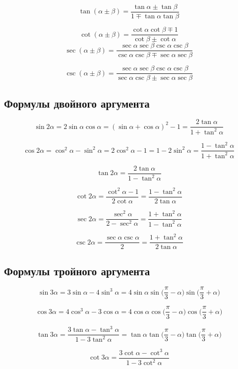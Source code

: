 \documentclass[
  letterpaper,
]{scrbook}
\theoremstyle{definition}
\theoremstyle{remark}
\begin{document}
\[
\tan (\alpha \pm \beta) = \frac{\tan \alpha \pm \tan \beta}{1 \mp \tan \alpha \tan \beta}
\]

\[
\cot (\alpha \pm \beta) = \frac{\cot \alpha \cot \beta \mp 1}{\cot \beta \pm \cot \alpha}
\] \[
\sec (\alpha \pm \beta) = \frac{\sec \alpha \sec \beta \csc \alpha \csc \beta}{\csc \alpha \csc \beta \mp \sec \alpha \sec \beta}
\]

\[
\csc (\alpha \pm \beta) = \frac{\sec \alpha \sec \beta \csc \alpha \csc \beta}{\sec \alpha \csc \beta \pm \sec \alpha \sec \beta}
\]

\subsection{Формулы двойного аргумента}\label{trig_double_arg}

\[
\sin 2\alpha = 2\sin \alpha \cos \alpha = (\sin \alpha + \cos \alpha)^2 -1 = \frac{2\tan \alpha}{1 + \tan^2 \alpha}
\]

\[
\cos 2\alpha = \cos^2 \alpha - \sin^2 \alpha = 2\cos^2 \alpha - 1 = 1 - 2\sin^2 \alpha = \frac{1 - \tan^2 \alpha}{1 + \tan^2 \alpha}
\]

\[
\tan 2\alpha = \frac{2\tan \alpha}{1 - \tan^2 \alpha}
\]

\[
\cot 2\alpha = \frac{\cot^2 \alpha - 1}{2 \cot \alpha} = \frac{1 - \tan^2 \alpha}{2 \tan \alpha}
\]

\[
\sec 2\alpha = \frac{\sec^2 \alpha}{2 - \sec^2 \alpha} = \frac{1 + \tan^2 \alpha}{1 - \tan^2 \alpha}
\]

\[
\csc 2\alpha = \frac{\sec \alpha \csc \alpha}{2} = \frac{1 + \tan^2 \alpha}{2 \tan \alpha}
\]

\subsection{Формулы тройного аргумента}\label{trig_triple_arg}

\[
\sin 3\alpha = 3\sin \alpha - 4 \sin^3 \alpha = 4\sin \alpha \sin \Big( \frac{\pi}{3} - \alpha\Big) \sin \Big( \frac{\pi}{3} + \alpha \Big)
\]

\[
\cos 3\alpha = 4\cos^3 \alpha - 3 \cos \alpha = 4\cos \alpha \cos \Big(\frac{\pi}{3} - \alpha\Big) \cos \Big(\frac{\pi}{3} + \alpha\Big)
\]

\[
\tan 3\alpha = \frac{3\tan \alpha - \tan^3 \alpha}{1 - 3\tan^2 \alpha} = \tan \alpha \tan \Big( \frac{\pi}{3} - \alpha \Big) \tan \Big(\frac{\pi}{3} + \alpha \Big)
\]

\[
\cot 3\alpha = \frac{3 \cot \alpha - \cot^3 \alpha}{1 - 3\cot^2 \alpha}
\]
\end{document}
